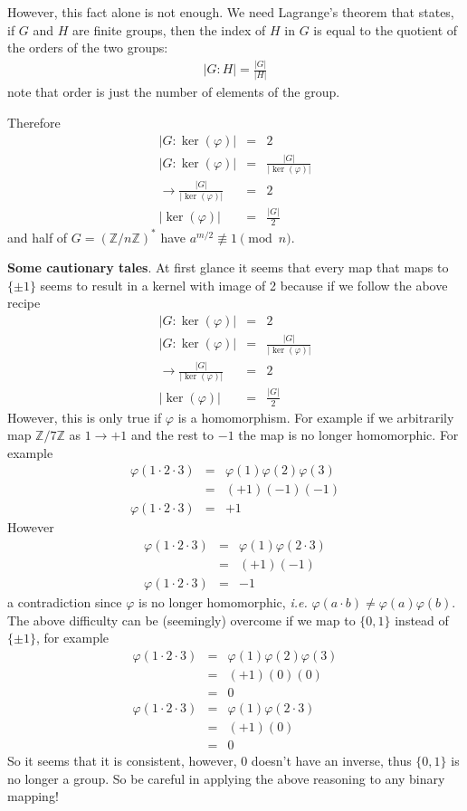 \documentclass[aps,preprint,preprintnumbers,nofootinbib,showpacs,prd]{revtex4-1}
\newcommand{\ie}{{\it i.e.} }
\newcommand{\nbea}{\begin{eqnarray*}}
\newcommand{\neea}{\end{eqnarray*}}
\begin{document}
However, this fact alone is not enough. We need Lagrange's theorem that states, if $G$ and $H$ are finite groups, then the index of $H$ in $G$ is equal to the quotient of the orders of the two groups:
%
\nbea
|G:H| = \frac{|G|}{|H|}
\neea
%
note that order is just the number of elements of the group.

Therefore 
%
\nbea
|G:\ker(\varphi)| & = & 2 \\
|G:\ker(\varphi)| & = & \frac{|G|}{|\ker(\varphi)|} \\
\to \frac{|G|}{|\ker(\varphi)|} & = & 2 \\
|\ker(\varphi)| & = & \frac{|G|}{2}
\neea
%
and half of $G = (\mathbb{Z}/n\mathbb{Z})^*$ have $a^{m/2} \not\equiv 1 \pmod{n}$.

{\bf Some cautionary tales}. At first glance it seems that every map that maps to $\{\pm1\}$ seems to result in a kernel with image of 2 because if we follow the above recipe
%
\nbea
|G:\ker(\varphi)| & = & 2 \\
|G:\ker(\varphi)| & = & \frac{|G|}{|\ker(\varphi)|} \\
\to \frac{|G|}{|\ker(\varphi)|} & = & 2 \\
|\ker(\varphi)| & = & \frac{|G|}{2}
\neea
%
However, this is only true if $\varphi$ is a homomorphism. For example if we arbitrarily map $\mathbb{Z}/7\mathbb{Z}$ as $1 \to +1$ and the rest to $-1$ the map is no longer homomorphic. For example
%
\nbea
\varphi(1\cdot2\cdot3) & = & \varphi(1)\varphi(2)\varphi(3) \\
& = & (+1)(-1)(-1) \\
\varphi(1\cdot2\cdot3) & = & +1
\neea
%
However
%
\nbea
\varphi(1\cdot2\cdot3) & = & \varphi(1)\varphi(2\cdot 3) \\
& = & (+1)(-1) \\
\varphi(1\cdot2\cdot3) & = & -1
\neea
%
a contradiction since $\varphi$ is no longer homomorphic, \ie $\varphi(a\cdot b) \neq \varphi(a)\varphi(b)$. The above difficulty can be (seemingly) overcome if we map to $\{0,1\}$ instead of $\{\pm1\}$, for example
%
\nbea
\varphi(1\cdot2\cdot3) & = & \varphi(1)\varphi(2)\varphi(3) \\
& = & (+1)(0)(0) \\
& = & 0 \\
\varphi(1\cdot2\cdot3) & = & \varphi(1)\varphi(2\cdot 3) \\
& = & (+1)(0) \\
& = & 0
\neea
%
So it seems that it is consistent, however, $0$ doesn't have an inverse, thus $\{0,1\}$ is no longer a group. So be careful in applying the above reasoning to any binary mapping!
\end{document}

